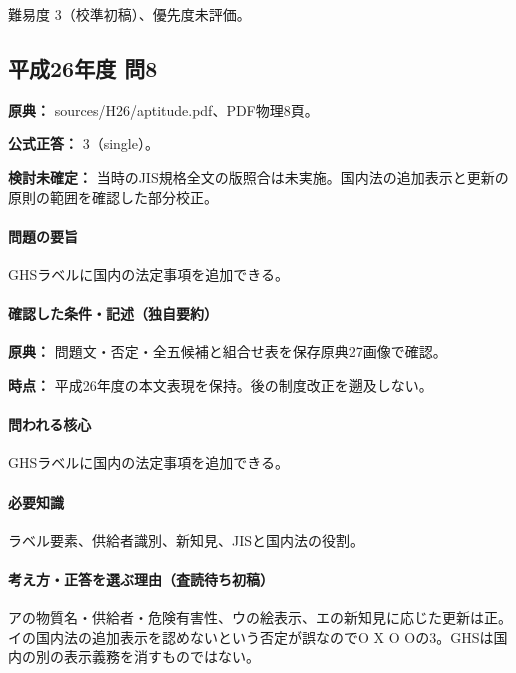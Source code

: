\par 難易度 3（校準初稿）、優先度未評価。

\subsection{平成26年度 問8}
\label{q:h26-reg-apt-08}

\noindent\textbf{原典：} sources/H26/aptitude.pdf、PDF物理8頁。

\textbf{公式正答：} 3（single）。

\par\textbf{検討未確定：} 当時のJIS規格全文の版照合は未実施。国内法の追加表示と更新の原則の範囲を確認した部分校正。

\paragraph{問題の要旨} GHSラベルに国内の法定事項を追加できる。

\paragraph{確認した条件・記述（独自要約）}\mbox{}\par

\noindent\textbf{原典：} 問題文・否定・全五候補と組合せ表を保存原典27画像で確認。\par

\noindent\textbf{時点：} 平成26年度の本文表現を保持。後の制度改正を遡及しない。\par

\paragraph{問われる核心} GHSラベルに国内の法定事項を追加できる。

\paragraph{必要知識} ラベル要素、供給者識別、新知見、JISと国内法の役割。

\paragraph{考え方・正答を選ぶ理由（査読待ち初稿）} アの物質名・供給者・危険有害性、ウの絵表示、エの新知見に応じた更新は正。イの国内法の追加表示を認めないという否定が誤なのでO X O Oの3。GHSは国内の別の表示義務を消すものではない。

